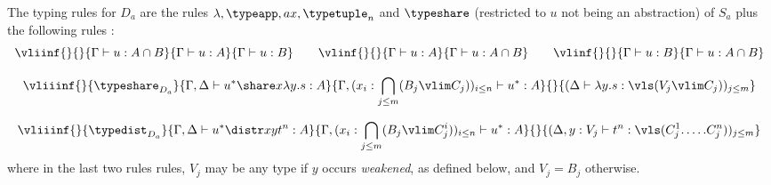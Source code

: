 % 
% 

% 


%
%
\noindent
The typing rules for $D_a$ are the rules $\lambda, \typeapp, ax, \typetuple _n$ and $\typeshare$ (restricted to $u$ not being an abstraction) of $S_a$ plus the following rules :
\[
	\vliinf{}{}
	  {\Gamma \vdash u: A\cap B}
	  {\Gamma \vdash u: A}
	  {\Gamma \vdash u: B}
	\qquad
	\vlinf{}{}
	  {\Gamma \vdash u: A}
	  {\Gamma \vdash u: A\cap B}
	\qquad
	\vlinf{}{}
	  {\Gamma \vdash u: B}
	  {\Gamma \vdash u: A\cap B}
\]

\[
	\vliiinf{}{\typeshare_{D_a}}
	  {\Gamma,\Delta \vdash u^*\share x{\lambda y.s}:A}
	  {\Gamma, (x_i:\bigcap_{j\leq m}(B_j\vlim C_j))_{i\leq n} \vdash u^*:A}
	  {}
	  {(\Delta \vdash \lambda y.s : \vls(V_j\vlim C_j))_{j\leq m}}
\]

\[
	\vliiinf{}{\typedist_{D_a}}
	  {\Gamma,\Delta \vdash u^*\distr xy{t^n}:A}
	  {\Gamma, (x_i:\bigcap_{j\leq m}(B_j\vlim C^i_j))_{i\leq n} \vdash u^*:A}
	  {}
	  {(\Delta, y:V_j\vdash t^n : \vls(C_j^1.\dots.C_j^n))_{j\leq m}}
\]
where in the last two rules rules, $V_j$ may be any type if $y$ occurs \emph{weakened}, as defined below, and $V_j=B_j$ otherwise.

